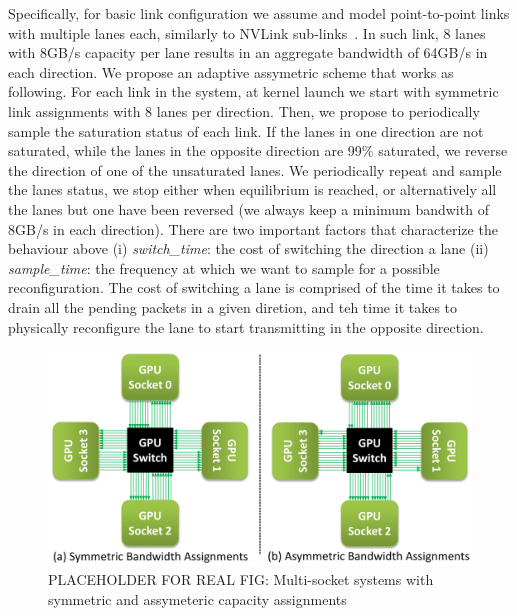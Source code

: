 Specifically, for basic link configuration we assume and model point-to-point
links with multiple lanes each, similarly to NVLink
sub-links~\cite{pascal-tesla-wp}.  In such link, 8 lanes with 8GB/s capacity
per lane results in an aggregate bandwidth of 64GB/s in each direction. We
propose an adaptive assymetric scheme that works as following. For each link
in the system, at kernel launch we start with symmetric link assignments with 8
lanes per direction. Then, we propose to periodically sample the saturation
status of each link. If the lanes in one direction are not saturated, while the
lanes in the opposite direction are 99\% saturated, we reverse the direction of
one of the unsaturated lanes. We periodically repeat and sample the lanes
status, we stop either when equilibrium is reached, or alternatively all the lanes but one
have been reversed (we always keep a minimum bandwith of 8GB/s in each
direction).  
There are two important factors that characterize the
behaviour above (i) \emph{switch\_time}: the cost of switching the direction a
lane (ii) \emph{sample\_time}: the frequency at which we want to sample for a
possible reconfiguration. The cost of switching a lane is comprised of the time
it takes to drain all the pending packets in a given diretion, and teh time it
takes to physically reconfigure the lane to start transmitting in the opposite
direction.

\begin{figure}[t]
    \centering
    \includegraphics[width=1.0\columnwidth]{figures/tms_links.pdf}
    \caption{PLACEHOLDER FOR REAL FIG: Multi-socket systems with symmetric and
    assymeteric capacity assignments}
    \label{fig:symmetric_assymetric}
\end{figure}

